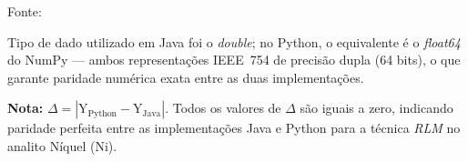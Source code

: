 \begin{table}[H]
\begin{threeparttable}
\begin{center}
\begin{minipage}{0.85\linewidth}
\begin{tablenotes}
\footnotesize
\item Fonte:~\oautor
\item[a] Tipo de dado utilizado em Java foi o \textit{double}; no Python,
o equivalente é o \textit{float64} do NumPy — ambos representações IEEE~754
de precisão dupla (64 bits), o que garante paridade numérica exata entre as
duas implementações.
\item \textbf{Nota:} $\Delta = |\text{Y}_{\text{Python}} - \text{Y}_{\text{Java}}|$.
Todos os valores de $\Delta$ são iguais a zero, indicando paridade
perfeita entre as implementações Java e Python para a técnica \textit{RLM}
no analito Níquel (Ni).
\end{tablenotes}
\end{minipage}
\end{center}
\end{threeparttable}
\end{table}

